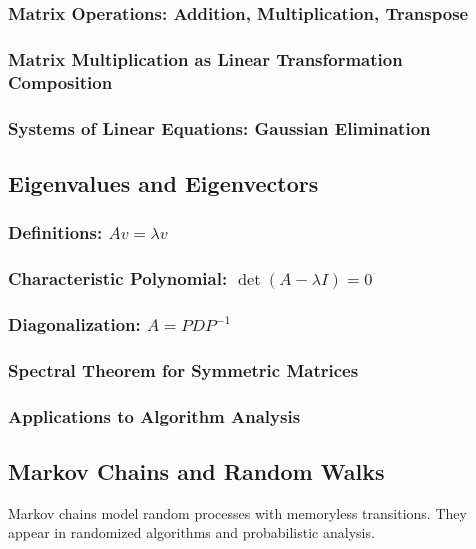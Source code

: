 \subsubsection{Matrix Operations: Addition, Multiplication, Transpose}
\subsubsection{Matrix Multiplication as Linear Transformation Composition}
\subsubsection{Systems of Linear Equations: Gaussian Elimination}

\subsection{Eigenvalues and Eigenvectors}
\label{subsec:eigenvalues}

\subsubsection{Definitions: $Av = \lambda v$}
\subsubsection{Characteristic Polynomial: $\det(A - \lambda I) = 0$}
\subsubsection{Diagonalization: $A = PDP^{-1}$}
\subsubsection{Spectral Theorem for Symmetric Matrices}
\subsubsection{Applications to Algorithm Analysis}

\subsection{Markov Chains and Random Walks}
\label{subsec:markov-chains}

\begin{subsectionintro}
Markov chains model random processes with memoryless transitions.
They appear in randomized algorithms and probabilistic analysis.
\end{subsectionintro}

